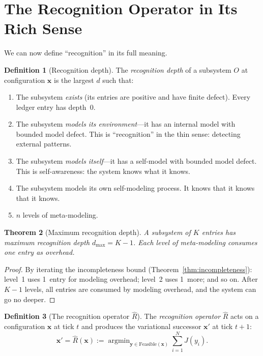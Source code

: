 \documentclass[11pt,a4paper]{article}
\theoremstyle{plain}
\newtheorem{theorem}{Theorem}[section]
\theoremstyle{definition}
\newtheorem{definition}[theorem]{Definition}
\theoremstyle{remark}
\newcommand{\Jcost}{J}
\begin{document}
\section{The Recognition Operator in Its Rich Sense}
\label{sec:recognition-operator}

We can now define ``recognition'' in its full meaning.

\begin{definition}[Recognition depth]
\label{def:depth}
The \emph{recognition depth} of a subsystem $O$ at configuration
$\mathbf{x}$ is the largest $d$ such that:
\begin{enumerate}[nosep]
\item[($d = 0$):]  The subsystem \emph{exists} (its entries are
  positive and have finite defect).  Every ledger entry has depth~0.
\item[($d = 1$):]  The subsystem \emph{models its environment}---it
  has an internal model with bounded model defect.  This is
  ``recognition'' in the thin sense: detecting external patterns.
\item[($d = 2$):]  The subsystem \emph{models itself}---it has a
  self-model with bounded model defect.  This is self-awareness: the
  system knows what it knows.
\item[($d = 3$):]  The subsystem models its own self-modeling process.
  It knows that it knows that it knows.
\item[($d = n$):]  $n$ levels of meta-modeling.
\end{enumerate}
\end{definition}

\begin{theorem}[Maximum recognition depth]
\label{thm:max-depth}
A subsystem of $K$ entries has maximum recognition depth
$d_{\max} = K - 1$.  Each level of meta-modeling consumes one entry
as overhead.
\end{theorem}

\begin{proof}
By iterating the incompleteness bound (Theorem~\ref{thm:incompleteness}):
level~1 uses 1~entry for modeling overhead; level~2 uses 1~more; and so
on.  After $K - 1$ levels, all entries are consumed by modeling
overhead, and the system can go no deeper.
\end{proof}

\begin{definition}[The recognition operator $\hat{R}$]
\label{def:R-hat}
The \emph{recognition operator} $\hat{R}$ acts on a configuration
$\mathbf{x}$ at tick $t$ and produces the variational successor
$\mathbf{x}'$ at tick $t+1$:
\[
  \mathbf{x}' = \hat{R}(\mathbf{x})
  := \mathop{\mathrm{argmin}}_{\mathbf{y} \in \mathrm{Feasible}(\mathbf{x})}
     \sum_{i=1}^N \Jcost(y_i).
\]
\end{definition}
\end{document}
